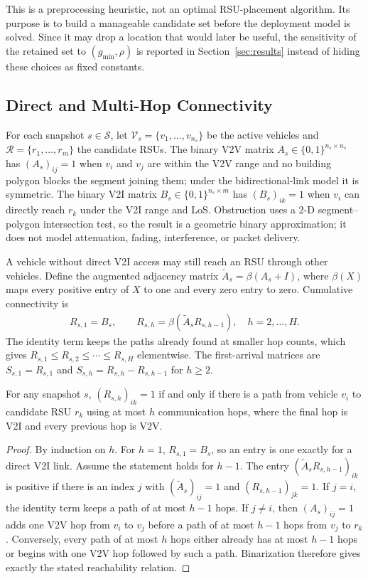 \documentclass[engproc,proceedingpaper,submit,oneauthor]{Definitions/mdpi}
\newcommand{\Atil}{\widetilde{A}}
\newcommand{\bin}[1]{\beta\!\left(#1\right)}
\begin{document}
This is a preprocessing heuristic, not an optimal RSU-placement algorithm. Its purpose
is to build a manageable candidate set before the deployment model is solved. Since it
may drop a location that would later be useful, the sensitivity of the retained set to
$(g_{\min},\rho)$ is reported in Section~\ref{sec:results} instead of hiding these
choices as fixed constants.

\subsection{Direct and Multi-Hop Connectivity}
For each snapshot $s\in\mathcal S$, let $\mathcal V_s=\{v_1,\ldots,v_{n_s}\}$ be the
active vehicles and $\mathcal R=\{r_1,\ldots,r_m\}$ the candidate RSUs. The binary V2V
matrix $A_s\in\{0,1\}^{n_s\times n_s}$ has $(A_s)_{ij}=1$ when $v_i$ and $v_j$ are
within the V2V range and no building polygon blocks the segment joining them; under the
bidirectional-link model it is symmetric. The binary V2I matrix
$B_s\in\{0,1\}^{n_s\times m}$ has $(B_s)_{ik}=1$ when $v_i$ can directly reach $r_k$
under the V2I range and LoS. Obstruction uses a 2-D segment--polygon intersection test,
so the result is a geometric binary approximation; it does not model attenuation,
fading, interference, or packet delivery.

A vehicle without direct V2I access may still reach an RSU through other vehicles.
Define the augmented adjacency matrix $\Atil_s=\bin{A_s+I}$, where $\beta(X)$ maps
every positive entry of $X$ to one and every zero entry to zero. Cumulative
connectivity is
\begin{align}
R_{s,1} = B_s,\qquad
R_{s,h} = \bin{\Atil_s R_{s,h-1}},\quad h=2,\ldots,H.\label{eq:rh}
\end{align}
The identity term keeps the paths already found at smaller hop counts, which gives
$R_{s,1}\le R_{s,2}\le\cdots\le R_{s,H}$ elementwise. The first-arrival matrices are
$S_{s,1}=R_{s,1}$ and $S_{s,h}=R_{s,h}-R_{s,h-1}$ for $h\ge 2$.

\begin{Proposition}\label{prop:reachability}
For any snapshot $s$, $(R_{s,h})_{ik}=1$ if and only if there is a path from vehicle
$v_i$ to candidate RSU $r_k$ using at most $h$ communication hops, where the final hop
is V2I and every previous hop is V2V.
\end{Proposition}

\begin{proof}
By induction on $h$. For $h=1$, $R_{s,1}=B_s$, so an entry is one exactly for a direct
V2I link. Assume the statement holds for $h-1$. The entry $(\Atil_s R_{s,h-1})_{ik}$
is positive if there is an index $j$ with $(\Atil_s)_{ij}=1$ and $(R_{s,h-1})_{jk}=1$.
If $j=i$, the identity term keeps a path of at most $h-1$ hops. If $j\neq i$, then
$(A_s)_{ij}=1$ adds one V2V hop from $v_i$ to $v_j$ before a path of at most $h-1$ hops
from $v_j$ to $r_k$. Conversely, every path of at most $h$ hops either already has at
most $h-1$ hops or begins with one V2V hop followed by such a path. Binarization
therefore gives exactly the stated reachability relation.
\end{proof}
\end{document}
